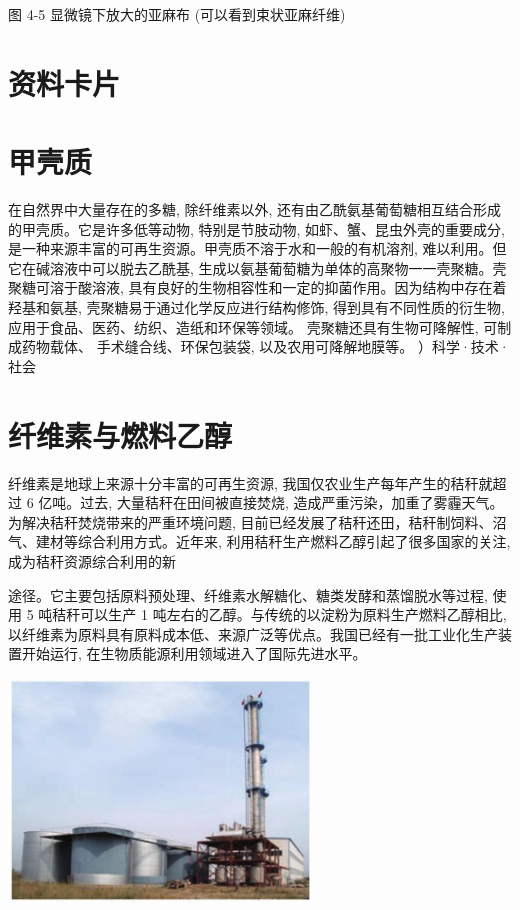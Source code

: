 \documentclass[10pt]{article}
\begin{document}
图 4-5 显微镜下放大的亚麻布 (可以看到束状亚麻纤维)

\section*{资料卡片}

\section*{甲壳质}

在自然界中大量存在的多糖, 除纤维素以外, 还有由乙酰氨基葡萄糖相互结合形成的甲壳质。它是许多低等动物, 特别是节肢动物, 如虾、蟹、昆虫外壳的重要成分, 是一种来源丰富的可再生资源。甲壳质不溶于水和一般的有机溶剂, 难以利用。但它在碱溶液中可以脱去乙酰基, 生成以氨基葡萄糖为单体的高聚物一一壳聚糖。壳聚糖可溶于酸溶液, 具有良好的生物相容性和一定的抑菌作用。因为结构中存在着羟基和氨基, 壳聚糖易于通过化学反应进行结构修饰, 得到具有不同性质的衍生物, 应用于食品、医药、纺织、造纸和环保等领域。 壳聚糖还具有生物可降解性, 可制成药物载体、 手术缝合线、环保包装袋, 以及农用可降解地膜等。 ）科学·技术·社会

\section*{纤维素与燃料乙醇}

纤维素是地球上来源十分丰富的可再生资源, 我国仅农业生产每年产生的秸秆就超过 6 亿吨。过去, 大量秸秆在田间被直接焚烧, 造成严重污染，加重了雾霾天气。为解决秸秆焚烧带来的严重环境问题, 目前已经发展了秸秆还田，秸秆制饲料、沼气、建材等综合利用方式。近年来, 利用秸秆生产燃料乙醇引起了很多国家的关注, 成为秸秆资源综合利用的新

途径。它主要包括原料预处理、纤维素水解糖化、糖类发酵和蒸馏脱水等过程, 使用 5 吨秸秆可以生产 1 吨左右的乙醇。与传统的以淀粉为原料生产燃料乙醇相比, 以纤维素为原料具有原料成本低、来源广泛等优点。我国已经有一批工业化生产装置开始运行, 在生物质能源利用领域进入了国际先进水平。

\begin{center}
\includegraphics[max width=0.6\textwidth]{images/0190efc5-b58a-7c43-bfb0-e0a030df9cfd_115_306772.jpg}
\end{center}
\end{document}
